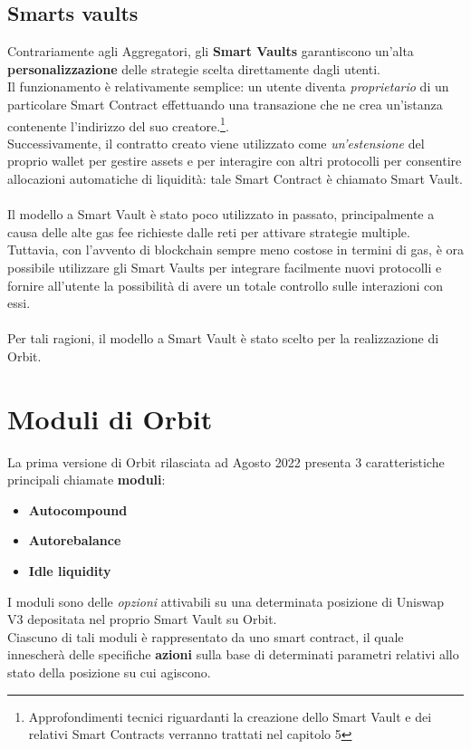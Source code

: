 \documentclass[12pt,a4paper]{report}
\begin{document}
\subsection{Smarts vaults}

Contrariamente agli Aggregatori, gli \textbf{Smart Vaults} garantiscono un'alta \textbf{personalizzazione} delle strategie scelta direttamente dagli utenti.
\\Il funzionamento è relativamente semplice: un utente diventa \textit{proprietario} di un particolare Smart Contract effettuando una transazione che ne crea un'istanza contenente l'indirizzo del suo creatore.\footnote{Approfondimenti tecnici riguardanti la creazione dello Smart Vault e dei relativi Smart Contracts verranno trattati nel capitolo 5}.
\\Successivamente, il contratto creato viene utilizzato come \textit{un'estensione} del proprio wallet per gestire assets e per interagire con altri protocolli per consentire allocazioni automatiche di liquidità: tale Smart Contract è chiamato Smart Vault.
\\\\Il modello a Smart Vault è stato poco utilizzato in passato, principalmente a causa delle alte gas fee richieste dalle reti per attivare strategie multiple.
\\Tuttavia, con l'avvento di blockchain sempre meno costose in termini di gas, è ora possibile utilizzare gli Smart Vaults per integrare facilmente nuovi protocolli e fornire all'utente la possibilità di avere un totale controllo sulle interazioni con essi.
\\\\Per tali ragioni, il modello a Smart Vault è stato scelto per la realizzazione di Orbit.

\section{Moduli di Orbit}
\label{modules}

La prima versione di Orbit rilasciata ad Agosto 2022 presenta 3 caratteristiche principali chiamate \textbf{moduli}: 

\begin{itemize}
  \item \textbf{Autocompound}
  \item \textbf{Autorebalance}
  \item \textbf{Idle liquidity}
\end{itemize}
\textbf{\list}
\noindent I moduli sono delle \textit{opzioni} attivabili su una determinata posizione di Uniswap V3 depositata nel proprio Smart Vault su Orbit. \\Ciascuno di tali moduli è rappresentato da uno smart contract, il quale innescherà delle specifiche \textbf{azioni} sulla base di determinati parametri relativi allo stato della posizione su cui agiscono.
\end{document}
